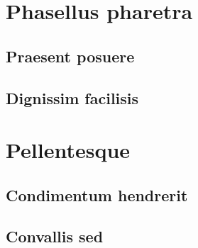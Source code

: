 			\lipsum[4-6]

	\section{Phasellus pharetra}
		\subsection{Praesent posuere}
			\lipsum[6-9]
		\subsection{Dignissim facilisis}
			\lipsum[10-12]
			
	\section{Pellentesque}
		\subsection{Condimentum hendrerit}
			\lipsum[13-14]
		\subsection{Convallis sed}
			\lipsum[15-17]
